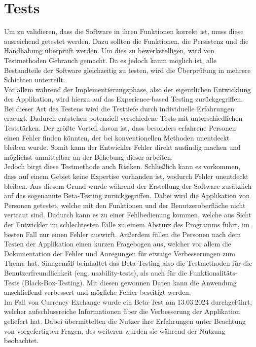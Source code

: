 \documentclass[conference]{IEEEtran}
\begin{document}
\section{Tests}
Um zu validieren, dass die Software in ihren Funktionen korrekt ist, muss diese ausreichend getestet werden. Dazu sollten die Funktionen, die Persistenz und die Handhabung überprüft werden. Um dies zu bewerkstelligen, wird von Testmethoden Gebrauch gemacht. Da es jedoch kaum möglich ist, alle Bestandteile der Software gleichzeitig zu testen, wird die Überprüfung in mehrere Schichten unterteilt.\\
Vor allem während der Implementierungsphase, also der eigentlichen Entwicklung der Applikation, wird hierzu auf das Experience-based Testing zurückgegriffen. Bei dieser Art des Testens wird die Testtiefe durch individuelle Erfahrungen erzeugt. Dadurch entstehen potenziell verschiedene Tests mit unterschiedlichen Teststärken. Der größte Vorteil davon ist, dass besonders erfahrene Personen einen Fehler finden könnten, der bei konventionellen Methoden unentdeckt bleiben wurde. Somit kann der Entwickler Fehler direkt ausfindig machen und möglichst unmittelbar an der Behebung dieser arbeiten.\\
Jedoch birgt diese Testmethode auch Risiken. Schließlich kann es vorkommen, dass auf einem Gebiet keine Expertise vorhanden ist, wodurch Fehler unentdeckt bleiben. Aus diesem Grund wurde während der Erstellung der Software zusätzlich auf das sogenannte Beta-Testing zurückgegriffen. Dabei wird die Applikation von Personen getestet, welche mit den Funktionen und der Benutzeroberfläche nicht vertraut sind. Dadurch kann es zu einer Fehlbedienung kommen, welche aus Sicht der Entwickler im schlechtesten Falle zu einem Absturz des Programms führt, im besten Fall nur einen Fehler auswirft. Außerdem füllen die Personen nach dem Testen der Applikation einen kurzen Fragebogen aus, welcher vor allem die Dokumentation der Fehler und Anregungen für etwaige Verbesserungen zum Thema hat. Sinngemäß beinhaltet das Beta-Testing also die Testmethoden für die Benutzerfreundlichkeit (eng. usability-tests), als auch für die Funktionalitäts-Tests (Black-Box-Testing). Mit diesen gewonnen Daten kann die Anwendung anschließend verbessert  und mögliche Fehler beseitigt werden. \\
Im Fall von Currency Exchange wurde ein Beta-Test am 13.03.2024 durchgeführt, welcher aufschlussreiche Informationen über die Verbesserung der Applikation geliefert hat. Dabei übermittelten die Nutzer ihre Erfahrungen unter Beachtung von vorgefertigten Fragen, des weiteren wurden sie während der Nutzung beobachtet. \\
\end{document}

